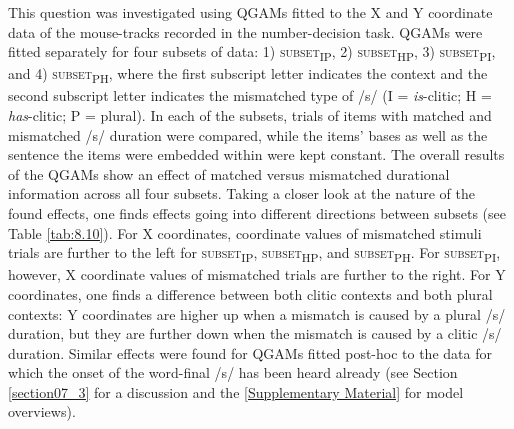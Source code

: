 This question was investigated using QGAMs fitted to the X and Y coordinate data of the mouse-tracks recorded in the number-decision task. QGAMs were fitted separately for four subsets of data: 1) \textsc{subset\textsubscript{IP}}, 2) \textsc{subset\textsubscript{HP}}, 3) \textsc{subset\textsubscript{PI}}, and 4) \textsc{subset\textsubscript{PH}}, where the first subscript letter indicates the context and the second subscript letter indicates the mismatched type of /s/ (I = \textit{is}-clitic; H = \textit{has}-clitic; P = plural). In each of the subsets, trials of items with matched and mismatched /s/ duration were compared, while the items’ bases as well as the sentence the items were embedded within were kept constant. The overall results of the QGAMs show an effect of matched versus mismatched durational information across all four subsets. Taking a closer look at the nature of the found effects, one finds effects going into different directions between subsets (see Table \ref{tab:8.10}). For X coordinates, coordinate values of mismatched stimuli trials are further to the left for \textsc{subset\textsubscript{IP}}, \textsc{subset\textsubscript{HP}}, and \textsc{subset\textsubscript{PH}}. For \textsc{subset\textsubscript{PI}}, however, X coordinate values of mismatched trials are further to the right. For Y coordinates, one finds a difference between both clitic contexts and both plural contexts: Y coordinates are higher up when a mismatch is caused by a plural /s/ duration, but they are further down when the mismatch is caused by a clitic /s/ duration. Similar effects were found for QGAMs fitted post-hoc to the data for which the onset of the word-final /s/ has been heard already (see Section \ref{section07_3} for a discussion and the \ref{Supplementary Material} for model overviews).

